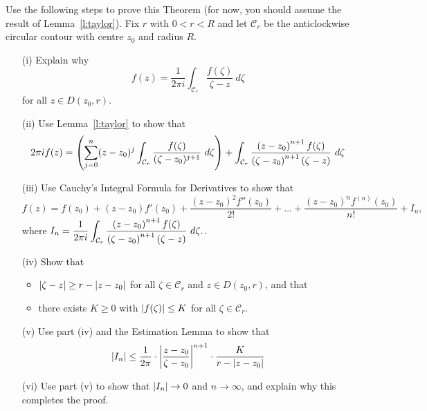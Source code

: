 \begin{exercise}
Use the following steps to prove this Theorem (for now, you should assume the result of Lemma~\ref{l:taylor}).  Fix $r$ with $0<r<R$ and let $\mathcal{C}_r$ be the anticlockwise circular contour with centre $z_0$ and radius $R$.
\begin{enumerate}
\item[(i)]  Explain why 
\[
f(z) = \frac{1}{2\pi i} \int_{\mathcal{C}_r} \frac{f(\zeta)}{\zeta-z}\ d\zeta
\]
for all $z \in D(z_0,r)$.

\item[(ii)] Use Lemma~\ref{l:taylor} to show that
\[
2\pi i f( z) = \left( \sum_{j=0}^n (z-z_0)^j  \int_{\mathcal{C}_r} \frac{f(\zeta)}{(\zeta-z_0)^{j+1}}\ d\zeta \right) + \int_{\mathcal{C}_r} \frac{\left( z-z_0 \right)^{n+1}f(\zeta)}{\left( \zeta-z_0 \right)^{n+1} \left( \zeta-z \right)}\ d\zeta
\]

\item[(iii)] Use Cauchy's Integral Formula for Derivatives to show that
\[
f(z) = f(z_0)+(z-z_0)f'(z_0)+\frac{(z-z_0)^2f''(z_0)}{2!}+\ldots+ \frac{(z-z_0)^n f^{(n)}(z_0)}{n!} + I_n,
\]
where $I_n = \displaystyle \frac{1}{2\pi i}\int_{\mathcal{C}_r}  \frac{\left( z-z_0 \right)^{n+1}f(\zeta)}{\left( \zeta-z_0 \right)^{n+1} \left( \zeta-z \right)}\ d\zeta.$.
\item[(iv)] Show that
\begin{itemize}
\item $\left| \zeta-z \right| \geq r - \left| z-z_0 \right|$ for all $\zeta \in \mathcal{C}_r$ and $z \in D(z_0,r)$, and that
\item there exists $K \geq 0$ with $\left| f(\zeta) \right| \leq K$ for all $\zeta \in \mathcal{C}_r$.
\end{itemize}
\item[(v)] Use part (iv) and the Estimation Lemma to show that
\[
\left| I_n \right| \leq \frac{1}{2\pi} \cdot \left| \frac{z-z_0}{\zeta-z_0} \right|^{n+1} \cdot \frac{K}{r-\left| z-z_0 \right|}
\]
\item[(vi) ] Use part (v) to show that $\left| I_n \right| \to 0$ and $n \to \infty$, and explain why this completes the proof.
\end{enumerate}
\end{exercise}

